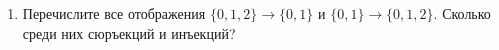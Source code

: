 \begin{enumerate}
    \item Перечислите все отображения $\{0, 1, 2\} \to \{0, 1\}$ и $\{0, 1\} \to \{0, 1, 2\}$. Сколько среди них сюръекций и инъекций?

\end{enumerate}
